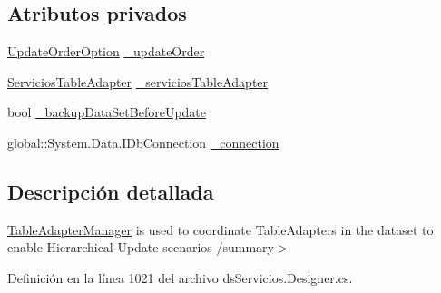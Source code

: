 \subsection*{Atributos privados}
\begin{DoxyCompactItemize}
\item 
\hyperlink{class_proyecto___integrador__3_1_1ds_servicios_table_adapters_1_1_table_adapter_manager_a9e1f8ef540de00f735f491b729080797}{Update\-Order\-Option} \hyperlink{class_proyecto___integrador__3_1_1ds_servicios_table_adapters_1_1_table_adapter_manager_a03766183451334c85f8632ffdcd0e0ea}{\-\_\-update\-Order}
\item 
\hyperlink{class_proyecto___integrador__3_1_1ds_servicios_table_adapters_1_1_servicios_table_adapter}{Servicios\-Table\-Adapter} \hyperlink{class_proyecto___integrador__3_1_1ds_servicios_table_adapters_1_1_table_adapter_manager_ac26b431a74f60f4ba1f8cc57cb5e75e2}{\-\_\-servicios\-Table\-Adapter}
\item 
bool \hyperlink{class_proyecto___integrador__3_1_1ds_servicios_table_adapters_1_1_table_adapter_manager_a927989eb7658909cc36dcf21241330f3}{\-\_\-backup\-Data\-Set\-Before\-Update}
\item 
global\-::\-System.\-Data.\-I\-Db\-Connection \hyperlink{class_proyecto___integrador__3_1_1ds_servicios_table_adapters_1_1_table_adapter_manager_a244f510259e41c7786eaca3bbe25db9a}{\-\_\-connection}
\end{DoxyCompactItemize}


\subsection{Descripción detallada}
\hyperlink{class_proyecto___integrador__3_1_1ds_servicios_table_adapters_1_1_table_adapter_manager}{Table\-Adapter\-Manager} is used to coordinate Table\-Adapters in the dataset to enable Hierarchical Update scenarios /summary$>$ 

Definición en la línea 1021 del archivo ds\-Servicios.\-Designer.\-cs.



